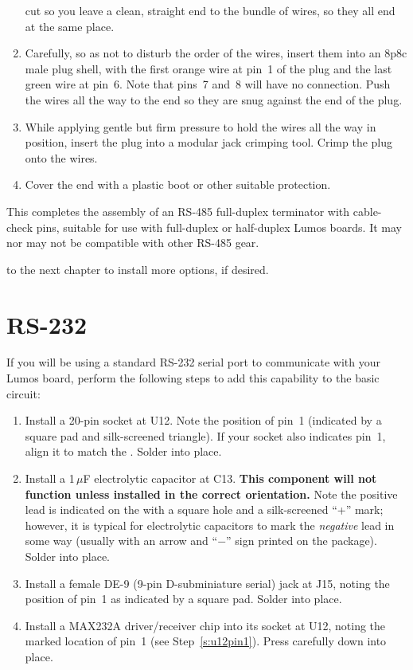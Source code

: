 \documentclass[letterpaper,twoside,onecolumn,openright,final]{memoir}
\begin{document}
\begin{enumerate}
	cut so you leave a clean, straight end to the bundle of wires, so they all end at the same
	place.
\item	Carefully, so as not to disturb the order of the wires, insert them into an 8p8c male plug
	shell, with the first orange wire at pin~1 of the plug and the last green wire at pin~6.
	Note that pins~7 and~8 will have no connection.  Push the wires all the way to the end so they
	are snug against the end of the plug.
\item	While applying gentle but firm pressure to hold the wires all the way in position, insert the
	plug into a modular jack crimping tool. Crimp the plug onto the wires.
\item	Cover the end with a plastic boot or other suitable protection.
\end{enumerate}

This completes the assembly of an RS-485 full-duplex terminator with cable-check pins, suitable
for use with full-duplex or half-duplex Lumos boards.  It may nor may not be compatible with other
RS-485 gear.

\bigskip{} to the next chapter to install more options, if desired.

\section{RS-232}
If you will be using a standard RS-232 serial port to communicate with your Lumos board,
perform the following steps to add this capability to the basic  circuit:
\begin{enumerate}
\item\label{s:u12pin1}
	Install a 20-pin  socket at U12.  Note the position of pin~1 (indicated
	by a square pad and silk-screened triangle).  If your socket also indicates pin~1, align
	it to match the . Solder into place.
\item	Install a 1\,$\mu$F electrolytic capacitor at C13. {\bfseries This component will not
	function unless installed in the correct orientation.}  Note the positive lead is indicated
	on the  with a square hole and a silk-screened ``+'' mark; however, it is typical
	for electrolytic capacitors to mark the \emph{negative} lead in some way (usually with an arrow
	and ``$-$'' sign printed on the package).  Solder into place.
\item	Install a female DE-9 (9-pin D-subminiature serial) jack at J15, 
	noting the position of pin~1 as indicated by a square pad.  Solder into place.
\item	Install a MAX232A driver/receiver chip into its socket at U12, noting the marked location
	of pin~1 (see Step~\ref{s:u12pin1}).  Press carefully down into place.
\end{enumerate}
\end{document}
